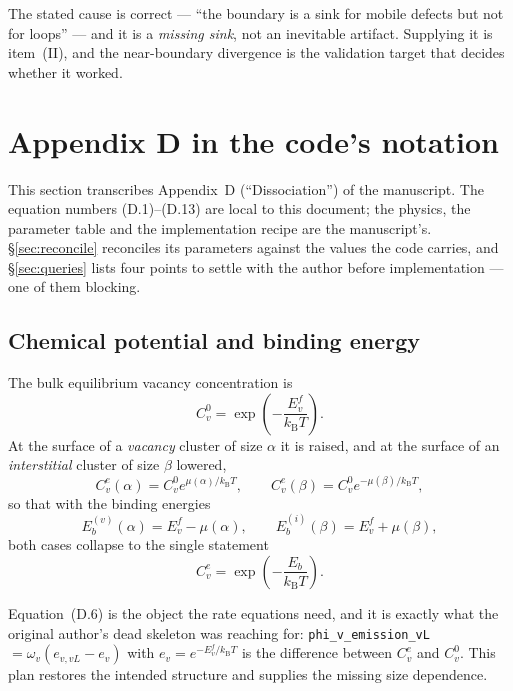 \documentclass[11pt]{article}
\newcommand{\kB}{k_{\mathrm B}}
\begin{document}
The stated cause is correct --- ``the boundary is a sink for mobile defects
but not for loops'' --- and it is a \emph{missing sink}, not an inevitable
artifact.  Supplying it is item~(II), and the near-boundary divergence is the
validation target that decides whether it worked.

\section{Appendix D in the code's notation}
\label{sec:appendixD}

This section transcribes Appendix~D (``Dissociation'') of the manuscript.
The equation numbers (D.1)--(D.13) are local to this document; the physics,
the parameter table and the implementation recipe are the manuscript's.
\S\ref{sec:reconcile} reconciles its parameters against the values the code
carries, and \S\ref{sec:queries} lists four points to settle with the author
before implementation --- one of them blocking.

\subsection{Chemical potential and binding energy}

The bulk equilibrium vacancy concentration is
\begin{equation*}
C_v^{0} = \exp\!\left(-\frac{E_v^{f}}{\kB T}\right).
\tag{D.1}
\end{equation*}
At the surface of a \emph{vacancy} cluster of size $\alpha$ it is raised, and
at the surface of an \emph{interstitial} cluster of size $\beta$ lowered,
\begin{equation*}
C_v^{e}(\alpha)=C_v^{0}e^{\mu(\alpha)/\kB T},
\qquad
C_v^{e}(\beta)=C_v^{0}e^{-\mu(\beta)/\kB T},
\tag{D.2--D.3}
\end{equation*}
so that with the binding energies
\begin{equation*}
E_b^{(v)}(\alpha)=E_v^{f}-\mu(\alpha),
\qquad
E_b^{(i)}(\beta)=E_v^{f}+\mu(\beta),
\tag{D.4--D.5}
\end{equation*}
both cases collapse to the single statement
\begin{equation*}
\boxed{\;C_v^{e} = \exp\!\left(-\frac{E_b}{\kB T}\right).\;}
\tag{D.6}
\end{equation*}

Equation~(D.6) is the object the rate equations need, and it is exactly what
the original author's dead skeleton was reaching for:
\verb|phi_v_emission_vL|~$=\omega_v(e_{v,vL}-e_v)$ with
$e_v=e^{-E_v^{f}/\kB T}$ is the difference between $C_v^{e}$ and $C_v^{0}$.
This plan restores the intended structure and supplies the missing size
dependence.
\end{document}
